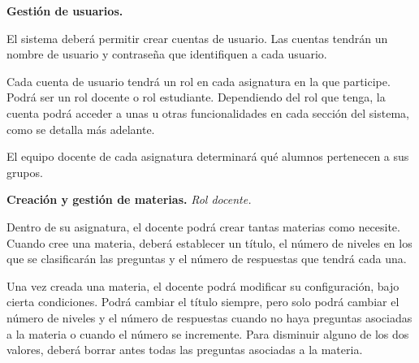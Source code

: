 \begin{rf0}

	\item \textbf{Gestión de usuarios.}
			\begin{rf0*}
				\item El sistema deberá permitir crear cuentas de usuario. Las cuentas tendrán un nombre de usuario y contraseña que identifiquen a cada usuario.
				\item Cada cuenta de usuario tendrá un rol en cada asignatura en la que participe. Podrá ser un rol docente o rol estudiante. Dependiendo del rol que tenga, la cuenta podrá acceder a unas u otras funcionalidades en cada sección del sistema, como se detalla más adelante.
				\item El equipo docente de cada asignatura determinará qué alumnos pertenecen a sus grupos.
			\end{rf0*} 

	\item \textbf{Creación y gestión de materias.} \textit{Rol docente.} 
			\begin{rf0*}
				\item Dentro de su asignatura, el docente podrá crear tantas materias como necesite. Cuando cree una materia, deberá establecer un título, el número de niveles en los que se clasificarán las preguntas y el número de respuestas que tendrá cada una.
				\item Una vez creada una materia, el docente podrá modificar su configuración, bajo cierta condiciones. Podrá cambiar el título siempre, pero solo podrá cambiar el número de niveles y el número de respuestas cuando no haya preguntas asociadas a la materia o cuando el número se incremente. Para disminuir alguno de los dos valores, deberá borrar antes todas las preguntas asociadas a la materia.
			\end{rf0*}


\end{rf0}
